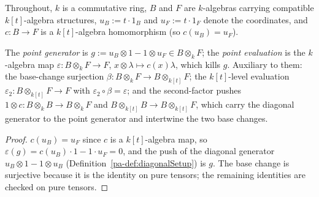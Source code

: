 Throughout, \(k\) is a commutative ring, \(B\) and \(F\) are \(k\)-algebras carrying
compatible \(k[t]\)-algebra structures, \(u_B := t \cdot 1_B\) and \(u_F := t \cdot 1_F\)
denote the coordinates, and \(c \colon B \to F\) is a \(k[t]\)-algebra homomorphism (so
\(c(u_B) = u_F\)).

\begin{definition}
  \label{pa-def:pointGen_pointEv}
  \leanok

  The \emph{point generator} is \(g := u_B \otimes 1 - 1 \otimes u_F \in B \otimes_k F\);
  the \emph{point evaluation} is the \(k\)-algebra map
  \(\varepsilon \colon B \otimes_k F \to F\), \(x \otimes \lambda \mapsto c(x)\lambda\),
  which kills \(g\). Auxiliary to them: the base-change surjection
  \(\beta \colon B \otimes_k F \to B \otimes_{k[t]} F\); the \(k[t]\)-level evaluation
  \(\varepsilon_2 \colon B \otimes_{k[t]} F \to F\) with
  \(\varepsilon_2 \circ \beta = \varepsilon\); and the second-factor pushes
  \(1 \otimes c \colon B \otimes_k B \to B \otimes_k F\) and
  \(B \otimes_{k[t]} B \to B \otimes_{k[t]} F\), which carry the diagonal generator to the
  point generator and intertwine the two base changes.
\end{definition}
\begin{proof}
  \leanok
  \(c(u_B) = u_F\) since \(c\) is a \(k[t]\)-algebra map, so
  \(\varepsilon(g) = c(u_B)\cdot 1 - 1 \cdot u_F = 0\), and the push of the diagonal
  generator \(u_B \otimes 1 - 1 \otimes u_B\) (Definition~\ref{pa-def:diagonalSetup}) is \(g\).
  The base change is surjective because it is the identity on pure tensors; the remaining
  identities are checked on pure tensors.
\end{proof}

